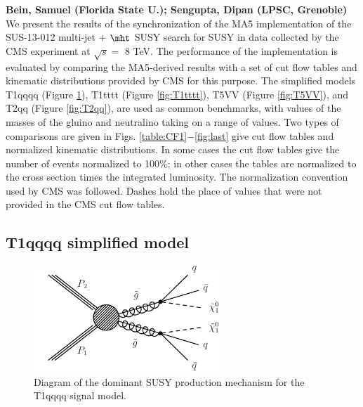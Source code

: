 \textbf{Bein, Samuel (Florida State U.); Sengupta, Dipan (LPSC, Grenoble)}\\
We present the results of the synchronization of the MA5
implementation of the SUS-13-012 multi-jet $+$ $\mht$ SUSY search for SUSY in data collected 
by the CMS experiment at $\sqrt{s}=$ 8 TeV.  The
performance of the implementation is evaluated by comparing the
MA5-derived results with a set of cut flow tables and kinematic
distributions provided by CMS for this purpose. The simplified models
T1qqqq (Figure \ref{fig:T1qqqq}), T1tttt (Figure \ref{fig:T1tttt}), T5VV (Figure \ref{fig:T5VV}), and T2qq (Figure \ref{fig:T2qq}), are used as common benchmarks, with values of the masses of the
gluino and neutralino taking on a range of values. Two types of
comparisons are given in Figs. \ref{table:CF1}$-$\ref{fig:last} give cut flow tables and normalized
kinematic distributions. In some cases the
cut flow tables give the number of events normalized to 100\%; in
other cases the tables are normalized to the cross section times the
integrated luminosity. The normalization convention used by CMS was
followed. Dashes hold the place of values that were not
provided in the CMS cut flow tables. 

\subsection{T1qqqq simplified model}
\begin{figure}[h!]
\centering
\includegraphics[width=7cm]{figures/Appendices/Ma5ValidationSUS13012/T1qqqq.pdf}
\caption{Diagram of the dominant SUSY production mechanism
for the T1qqqq signal model.}
\label{fig:T1qqqq}
\end{figure}

